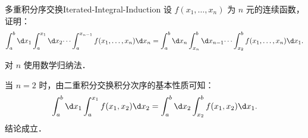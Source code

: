 \begin{problem}{多重积分序交换}{Iterated-Integral-Induction}
    设 $f(x_1, \dots, x_n)$ 为 $n$ 元的连续函数，证明：
    \begin{equation}
        \int_a^b \d x_1 \int_a^{x_1} \d x_2 \dots \int_a^{x_{n-1}} f(x_1, \dots, x_n) \d x_n = \int_a^b \d x_n \int_{x_n}^b \d x_{n-1} \dots \int_{x_2}^b f(x_1, \dots, x_n) \d x_1.
    \end{equation}
\end{problem}

\begin{myproof}

    对 $n$ 使用数学归纳法．

    当 $n=2$ 时，由二重积分交换积分次序的基本性质可知：
    \begin{equation}
        \int_a^b \d x_1 \int_a^{x_1} f(x_1, x_2) \d x_2 = \int_a^b \d x_2 \int_{x_2}^b f(x_1, x_2) \d x_1. \label{eq:base-case}
    \end{equation}
    结论成立．


\end{myproof}
